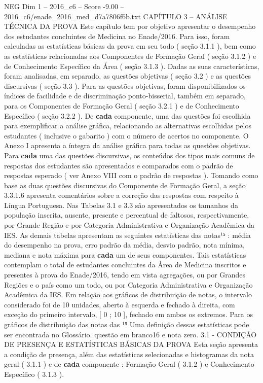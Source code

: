 \begin{textsample}{NEG Dim 1 – 2016\_c6 – Score -9.00 – 2016\_c6/enade\_2016\_med\_d7a7806f6b.txt}  \label{ex:f1_neg_042}
CAPÍTULO 3 – ANÁLISE TÉCNICA DA PROVA Este capítulo tem por objetivo apresentar o desempenho dos estudantes concluintes de Medicina no Enade/2016.
Para isso, foram calculadas as estatísticas básicas da prova em seu todo ( seção 3.1.1 ), bem como as estatísticas relacionadas aos Componentes de Formação Geral ( seção 3.1.2 ) e de Conhecimento Específico da Área ( seção 3.1.3 ).
Dadas as suas características, foram analisadas, em separado, as questões objetivas ( seção 3.2 ) e as questões discursivas ( seção 3.3 ).
Para as questões objetivas, foram disponibilizados os índices de facilidade e de discriminação ponto-bisserial, também em separado, para os Componentes de Formação Geral ( seção 3.2.1 ) e de Conhecimento Específico ( seção 3.2.2 ).
De \textbf{cada} componente, uma das questões foi escolhida para exemplificar a análise gráfica, relacionando as alternativas escolhidas pelos estudantes ( inclusive o gabarito ) com o número de acertos no componente.
O Anexo I apresenta a íntegra da análise gráfica para todas as questões objetivas.
Para \textbf{cada} uma das questões discursivas, os conteúdos dos tipos mais comuns de respostas dos estudantes são apresentados e comparados com o padrão de respostas esperado ( ver Anexo VIII com o padrão de respostas ).
Tomando como base as duas questões discursivas do Componente de Formação Geral, a seção 3.3.1.6 apresenta comentários sobre a correção das respostas com respeito à Língua Portuguesa.
Nas Tabelas 3.1 e 3.3 são apresentados os tamanhos da população inscrita, ausente, presente e percentual de faltosos, respectivamente, por Grande Região e por Categoria Administrativa e Organização Acadêmica da IES.
As demais tabelas apresentam as seguintes estatísticas das notas¹⁵ : média do desempenho na prova, erro padrão da média, desvio padrão, nota mínima, mediana e nota máxima para \textbf{cada} um de seus componentes.
Tais estatísticas contemplam o total de estudantes concluintes da Área de Medicina inscritos e presentes à prova do Enade/2016, tendo em vista agregações, ou por Grandes Regiões e o país como um todo, ou por Categoria Administrativa e Organização Acadêmica da IES.
Em relação aos gráficos de distribuição de notas, o intervalo considerado foi de 10 unidades, aberto à esquerda e fechado à direita, com exceção do primeiro intervalo, [ 0 ; 10 ], fechado em ambos os extremos.
Para os gráficos de distribuição das notas das ¹⁵ Uma definição dessas estatísticas pode ser encontrada no Glossário. questão em branco16 e nota zero. 3.1 - CONDIÇÃO DE PRESENÇA E ESTATÍSTICAS BÁSICAS DA PROVA Esta seção apresenta a condição de presença, além das estatísticas selecionadas e histogramas da nota geral ( 3.1.1 ) e de \textbf{cada} componente : Formação Geral ( 3.1.2 ) e Conhecimento Específico ( 3.1.3 ).

\end{textsample}
